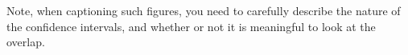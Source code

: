 % 
% 
% 
%
% 


% 


% 


% 
% 


Note, when captioning such figures, you need to carefully describe the nature of the confidence intervals, and whether or not it is meaningful to look at the overlap.  


